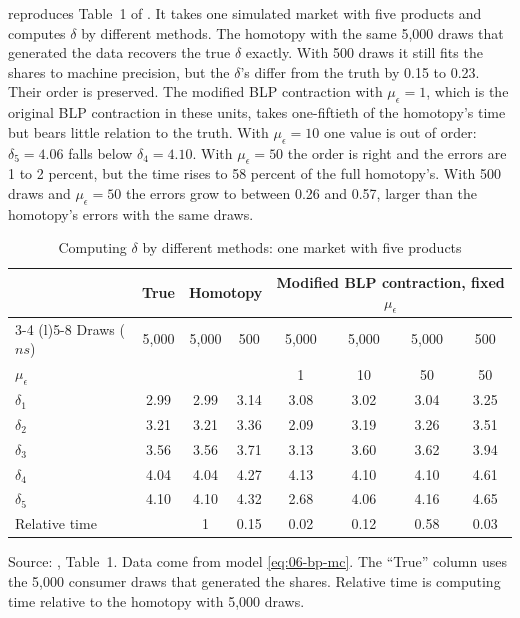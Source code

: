  reproduces Table~1 of \citet{BerryPakes2007}. It takes one simulated market with five products
and computes $\delta$ by different methods. The homotopy with the same 5,000 draws that generated the data recovers the
true $\delta$ exactly. With 500 draws it still fits the shares to machine precision, but the $\delta$'s differ from the truth
by 0.15 to 0.23. Their order is preserved. The modified BLP contraction with $\mu_\epsilon = 1$, which is the original BLP
contraction in these units, takes one-fiftieth of the homotopy's time but bears little relation to the truth. With
$\mu_\epsilon = 10$ one value is out of order: $\delta_5 = 4.06$ falls below $\delta_4 = 4.10$. With $\mu_\epsilon = 50$ the
order is right and the errors are 1 to 2 percent, but the time rises to 58 percent of the full homotopy's. With 500
draws and $\mu_\epsilon = 50$ the errors grow to between 0.26 and 0.57, larger than the homotopy's errors with the same
draws.

\begin{table}[htbp]
\centering
\caption{Computing $\delta$ by different methods: one market with five products}
\label{tab:06-bp-delta}
\small
\begin{tabular}{@{}lccccccc@{}}
\toprule
 & True & \multicolumn{2}{c}{Homotopy} & \multicolumn{4}{c}{Modified BLP contraction, fixed $\mu_\epsilon$} \\
\cmidrule(lr){3-4} \cmidrule(l){5-8}
Draws ($ns$) & 5,000 & 5,000 & 500 & 5,000 & 5,000 & 5,000 & 500 \\
$\mu_\epsilon$ & & & & 1 & 10 & 50 & 50 \\
\midrule
$\delta_1$ & 2.99 & 2.99 & 3.14 & 3.08 & 3.02 & 3.04 & 3.25 \\
$\delta_2$ & 3.21 & 3.21 & 3.36 & 2.09 & 3.19 & 3.26 & 3.51 \\
$\delta_3$ & 3.56 & 3.56 & 3.71 & 3.13 & 3.60 & 3.62 & 3.94 \\
$\delta_4$ & 4.04 & 4.04 & 4.27 & 4.13 & 4.10 & 4.10 & 4.61 \\
$\delta_5$ & 4.10 & 4.10 & 4.32 & 2.68 & 4.06 & 4.16 & 4.65 \\
\midrule
Relative time & & 1 & 0.15 & 0.02 & 0.12 & 0.58 & 0.03 \\
\bottomrule
\end{tabular}

\smallskip
\begin{minipage}{0.92\textwidth}
\footnotesize Source: \citet{BerryPakes2007}, Table~1. Data come from model \eqref{eq:06-bp-mc}. The ``True'' column
uses the 5,000 consumer draws that generated the shares. Relative time is computing time relative to the homotopy with
5,000 draws.
\end{minipage}
\end{table}

